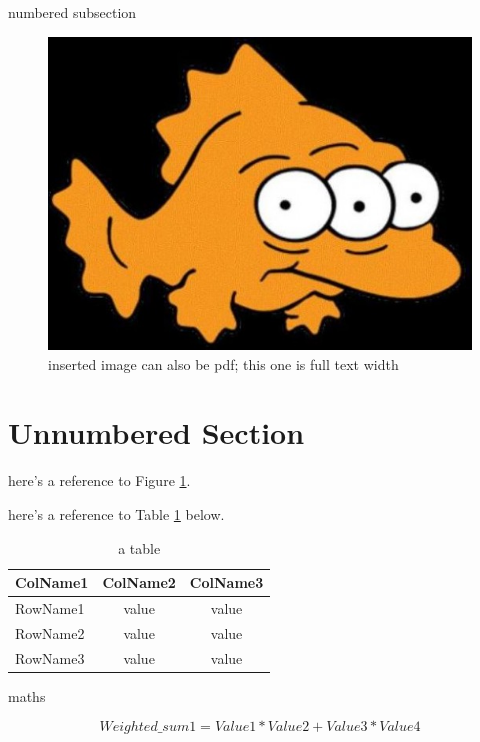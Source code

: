 \documentclass[11pt, a4paper]{article}
\begin{document}
    numbered subsection

    \begin{figure}[hbt!]
        \centering
        \includegraphics[width=\textwidth]{3uddg6.png}
        \caption{inserted image can also be pdf; this one is full text width}
        \label{imagename}
    \end{figure}

    \section*{Unnumbered Section} 

    here's a reference to Figure \ref{imagename}.

    here's a reference to Table \ref{tablename} below.
    
    \begin{table}[ht]
        \centering
        \begin{tabular}{|l|c|c|}
            \hline
            ColName1&ColName2&ColName3 \\
            \hline
            RowName1 & value & value \\
            RowName2 & value & value \\
            RowName3 & value & value \\
            \hline
        \end{tabular}
        \caption{a table}
        \label{tablename}
    \end{table}


    maths

    $$ Weighted\_sum1 = Value1 * Value2 + Value3 * Value4 $$

    \printbibliography
    
    \nocite{*}
\end{document}
